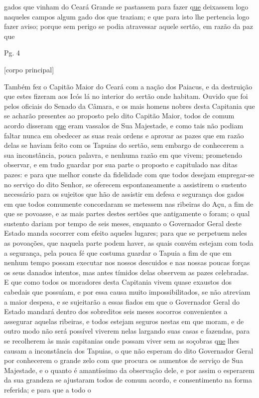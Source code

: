 \begin{refsection}
gados que vinham do Ceará Grande se pastassem para fazer q\underline{ue} deixassem logo naqueles campos algum gado dos que traziam; e que para isto lhe pertencia logo fazer aviso; porque sem perigo se podia atravessar aquele sertão, em razão da paz que


    \vspace{5mm}

    \noindent{}Pg. 4

    \vspace{1ex}

    \noindent{}[corpo principal] 

    \vspace{1ex}

    Também fez o Capitão Maior do Ceará com a nação dos Paiacus, e da destruição que estes fizeram aos Icós lá no interior do sertão onde habitam. Ouvido que foi pelos oficiais do Senado da Câmara, e os mais homens nobres desta Capitania que se acharão presentes ao proposto pelo dito Capitão Maior, todos de comum acordo disseram q\underline{ue} eram vassalos de Sua Majestade, e como tais não podiam faltar nunca em obedecer as suas reais ordens e aprovar as pazes que em razão delas se haviam feito com os Tapuias do sertão, sem embargo de conhecerem a sua inconstância, pouca palavra, e nenhuma razão em que vivem; prometendo observar, e em tudo guardar por sua parte o proposto e capitulado nas ditas pazes: e para que melhor conste da fidelidade com que todos desejam empregar-se no serviço do dito Senhor, se oferecem espontaneamente a assistirem o sustento necessário para os sujeitos que hão de assistir em defesa e segurança dos gados em que todos comumente concordaram se metessem nas ribeiras do Açu, a fim de que se povoasse, e as mais partes destes sertões que antigamente o foram; o qual sustento dariam por tempo de seis meses, enquanto o Governador Geral deste Estado manda socorrer com efeito aqueles lugares; para que se perpetuem neles as povoações, que naquela parte podem haver, as quais convém estejam com toda a segurança, pela pouca fé que costuma guardar o Tapuia a fim de que em nenhum tempo possam executar nos nossos descuidos e nas nossas poucas forças os seus danados intentos, mas antes tímidos delas observem as pazes celebradas. E que como todos os moradores desta Capitania vivem quase exaustos dos cabedais que possuíam, e por essa causa muito impossibilitados, se não atreviam a maior despesa, e se sujeitarão a essas fiados em que o Governador Geral do Estado mandará dentro dos sobreditos seis meses socorros convenientes a assegurar aquelas ribeiras, e todos estejam seguros nestas em que moram, e de outro modo não será possível viverem nelas largando suas casas e fazendas, para se recolherem às mais capitanias onde possam viver sem as soçobras q\underline{ue} lhes causam a inconstância dos Tapuias, o que não esperam do dito Governador Geral por conhecerem o grande zelo com que procura os aumentos de serviço de Sua Majestade, e o quanto é amantíssimo da observação dele, e por assim o esperarem da sua grandeza se ajustaram todos de comum acordo, e consentimento na forma referida; e para que a todo o 
\end{refsection}

